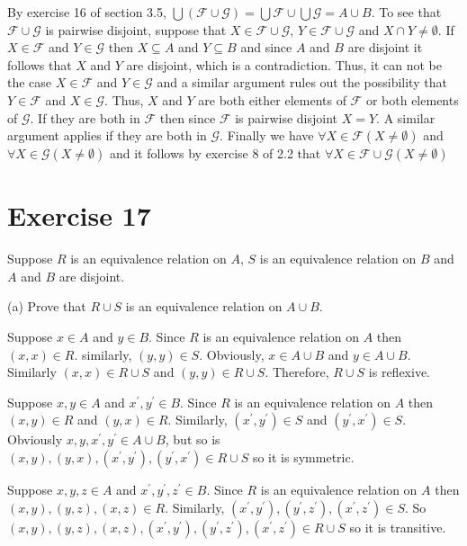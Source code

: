 \documentclass[11pt]{article}
\newcommand{\family}[1]{\mathcal{#1}}
\begin{document}
By exercise 16 of section 3.5, 
$\bigcup (\family{F} \cup \family{G}) = \bigcup \family{F} \cup \bigcup \family{G} = A \cup B$.
To see that $\family{F} \cup \family{G}$ is pairwise disjoint, suppose that 
$X \in \family{F} \cup \family{G}$, $Y \in \family{F} \cup \family{G}$ and 
$X \cap Y \neq \emptyset$. If $X \in \family{F}$ and $Y \in \family{G}$
then $X \subseteq A$ and $Y \subseteq B$ and since $A$ and $B$ are disjoint 
it follows that $X$ and $Y$ are disjoint, which is a contradiction. Thus, it 
can not be the case $X \in \family{F}$ and $Y \in \family{G}$ and a similar 
argument rules out the possibility that $Y \in \family{F}$ and $X \in \family{G}$.
Thus, $X$ and $Y$ are both either elements of $\family{F}$ or both elements 
of $\family{G}$. If they are both in $\family{F}$ then since $\family{F}$ is 
pairwise disjoint $X= Y$. A similar argument applies if they are both in 
$\family{G}$. Finally we have $\forall X \in \family{F} (X \neq \emptyset)$
and $\forall X \in \family{G} (X \neq \emptyset)$ and it follows by exercise 8
of 2.2 that $\forall X \in \family{F} \cup \family{G} (X \neq \emptyset)$

\section*{Exercise 17}

Suppose $R$ is an equivalence relation on $A$, $S$ is an equivalence relation 
on $B$ and $A$ and $B$ are disjoint. 

\noindent (a) Prove that $R \cup S$ is an equivalence relation on $A \cup B$.

Suppose $x \in A$ and $y \in B$. Since $R$ is an equivalence relation on $A$ then 
$(x,x) \in R$. similarly, $(y,y) \in S$. Obviously, $x \in A \cup B$ and $y \in A \cup B$.
Similarly $(x,x) \in R \cup S$ and $(y,y) \in R \cup S$. Therefore, $R \cup S$ 
is reflexive.

Suppose $x,y \in A$ and $x^\prime, y^\prime \in B$. Since $R$ is an equivalence
relation on $A$ then $(x,y) \in R$ and $(y,x) \in R$. Similarly, 
$(x^\prime, y^\prime) \in S$ and $(y^\prime, x^\prime) \in S$. Obviously
$x, y, x^\prime, y^\prime \in A \cup B$, but so is 
$(x,y),(y,x),(x^\prime,y^\prime),(y^\prime,x^\prime) \in R \cup S$ so it is 
symmetric.

Suppose $x,y,z \in A$ and $x^\prime, y^\prime, z^\prime \in B$. Since $R$ is 
an equivalence relation on $A$ then $(x,y), (y,z), (x,z) \in R$. Similarly,
$(x^\prime, y^\prime), (y^\prime, z^\prime), (x^\prime, z^\prime) \in S$.
So $(x,y), (y,z), (x,z), (x^\prime, y^\prime), (y^\prime, z^\prime), (x^\prime, z^\prime) \in R \cup S$
so it is transitive.
\end{document}

